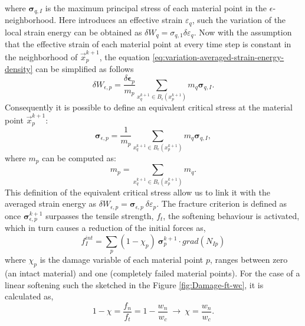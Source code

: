 \message{ !name(2020_EFM_MPM_Eigensoftening.tex)}\documentclass[preprint,12pt,a4paper]{elsarticle}
\newcommand{\tens}[1]{
  \ensuremath{\mathbf{{#1}}}
}
\newcommand\Grad[1]{grad({#1})}
\begin{document}
where $\tens{\sigma}_{q,I}$ is the maximum principal stress of each
material point in the $\epsilon$-neighborhood. Here
\cite{Navas_2017_ES} introduces an effective strain $\varepsilon_q$,
such the variation of the local strain energy can be obtained as
$\delta W_q = \sigma_{q,1} \delta\varepsilon_q$. Now with the assumption
that the effective strain of each material point at every time step
is constant in the neighborhood of $\vec{x}_p^{k+1}$, the equation
\eqref{eq:variation-averaged-strain-energy-density} can be simplified
as follows
\begin{equation}
  \label{eq:variation-averaged-strain-energy-density-simpli}
  \delta W_{\epsilon,p} =
  \frac{\delta \tens{\epsilon}_p}{m_p} \sum_{x_q^{k+1} \in
  B_{\epsilon}(x_p^{k+1})} m_q \tens{\sigma}_{q,I}. 
\end{equation}
Consequently it is possible to define an equivalent critical stress at the
material point $\vec{x}_p^{k+1}$:
\begin{equation}
  \label{eq:equivalent-critical-stress}
  \tens{\sigma}_{\epsilon,p} =
  \frac{1}{m_p} \sum_{x_q^{k+1} \in
  B_{\epsilon}(x_p^{k+1})} m_q \tens{\sigma}_{q,I}, 
\end{equation}
where $m_p$ can be computed as:
\begin{equation}
  \label{eq:averaged-mass}
  m_p = \sum_{x_q^{k+1} \in B_{\epsilon}(x_p^{k+1})} m_q.
\end{equation}
This definition of the equivalent critical stress allow us to
link it with the averaged strain energy as $\delta W_{\epsilon,p} =
 \tens{\sigma}_{\epsilon,p}\ \delta\varepsilon_p$. The fracture
criterion is defined as once $\tens{\sigma}_{\epsilon,p}^{k+1}$
surpasses the tensile strength, $f_t$, the softening behaviour is
activated, which in turn causes a reduction of the initial forces as,
 \begin{equation}
   \label{eq:f-int-damaged}
   f^{int}_I = \sum_p (1 - \chi_p)\ \tens{\sigma}_{p}^{k+1} \cdot \Grad{N_{Ip}}
 \end{equation}
where $\chi_p$ is the damage variable of each material point $p$,
ranges between zero (an intact material) and one (completely failed
material points). For the case of a linear softening such the sketched
in the Figure \ref{fig:Damage-ft-wc}, it is calculated as,
 \begin{equation}
   \label{eq:damaged-variable-chi}
   1 - \chi = \frac{f_n}{f_t} = 1 - \frac{w_n}{w_c}\ \rightarrow\ \chi
   = \frac{w_n}{w_c}.
 \end{equation}
 
\end{document}
